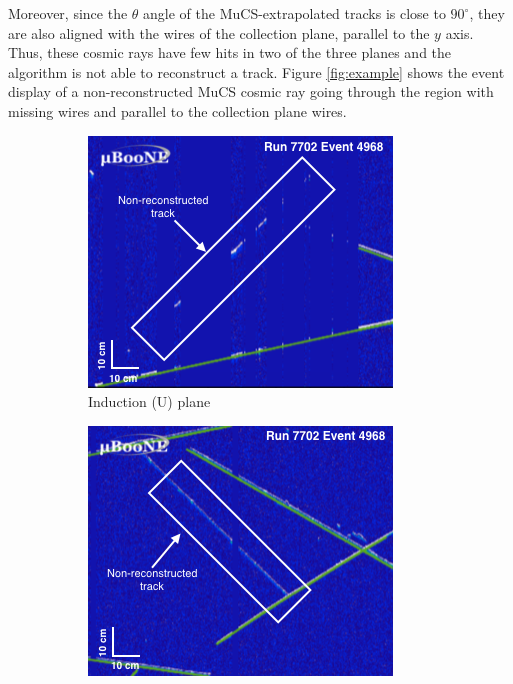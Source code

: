 \documentclass[a4paper,11pt]{article}
\begin{document}
Moreover, since the $\theta$ angle of the MuCS-extrapolated tracks is close to $90^\circ$, they are also aligned with the wires of the collection plane, parallel to the $y$ axis. Thus, these cosmic rays have few hits in two of the three planes and the algorithm is not able to reconstruct a track. Figure \ref{fig:example} shows the event display of a non-reconstructed MuCS cosmic ray going through the region with missing wires and parallel to the collection plane wires.

\begin{figure}[htbp]
  \begin{center}
    \begin{subfigure}{0.3\textwidth}
      \includegraphics[width=\linewidth]{figures/u.png}
      \caption{Induction (U) plane} \label{fig:u}
    \end{subfigure}
    \begin{subfigure}{0.3\textwidth}
      \includegraphics[width=\linewidth]{figures/v.png}

\end{subfigure}
\end{center}
\end{figure}
\end{document}
